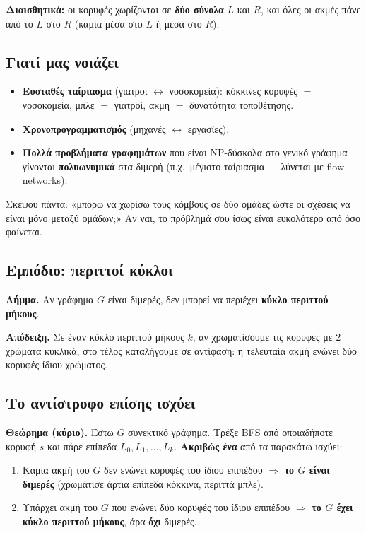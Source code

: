 \documentclass[11pt,a4paper]{article}
\begin{document}
\textbf{Διαισθητικά:} οι κορυφές χωρίζονται σε \textbf{δύο σύνολα} $L$ και $R$,
και όλες οι ακμές πάνε από το $L$ στο $R$ (καμία μέσα στο $L$ ή μέσα στο $R$).

\subsection{Γιατί μας νοιάζει}

\begin{itemize}
  \item \textbf{Ευσταθές ταίριασμα} (γιατροί $\leftrightarrow$ νοσοκομεία):
  κόκκινες κορυφές $=$ νοσοκομεία, μπλε $=$ γιατροί, ακμή $=$ δυνατότητα
  τοποθέτησης.
  \item \textbf{Χρονοπρογραμματισμός} (μηχανές $\leftrightarrow$ εργασίες).
  \item \textbf{Πολλά προβλήματα γραφημάτων} που είναι NP-δύσκολα στο γενικό
  γράφημα γίνονται \textbf{πολυωνυμικά} στα διμερή (π.χ.\ μέγιστο ταίριασμα ---
  λύνεται με flow networks).
\end{itemize}

\begin{intuition}
Σκέψου πάντα: «μπορώ να χωρίσω τους κόμβους σε δύο ομάδες ώστε οι σχέσεις να
είναι μόνο μεταξύ ομάδων;» Αν ναι, το πρόβλημά σου ίσως είναι ευκολότερο από όσο
φαίνεται.
\end{intuition}

\subsection{Εμπόδιο: περιττοί κύκλοι}

\begin{keypoint}
\textbf{Λήμμα.} Αν γράφημα $G$ είναι διμερές, δεν μπορεί να περιέχει \textbf{κύκλο
περιττού μήκους}.

\textbf{Απόδειξη.} Σε έναν κύκλο περιττού μήκους $k$, αν χρωματίσουμε τις κορυφές
με 2 χρώματα κυκλικά, στο τέλος καταλήγουμε σε αντίφαση: η τελευταία ακμή ενώνει
δύο κορυφές ίδιου χρώματος.
\end{keypoint}

\subsection{Το αντίστροφο επίσης ισχύει}

\begin{keypoint}
\textbf{Θεώρημα (κύριο).} Έστω $G$ συνεκτικό γράφημα. Τρέξε BFS από οποιαδήποτε
κορυφή $s$ και πάρε επίπεδα $L_0, L_1, \dots, L_k$. \textbf{Ακριβώς ένα} από τα
παρακάτω ισχύει:
\begin{enumerate}
  \item Καμία ακμή του $G$ δεν ενώνει κορυφές του ίδιου επιπέδου $\Rightarrow$
  \textbf{το $G$ είναι διμερές} (χρωμάτισε άρτια επίπεδα κόκκινα, περιττά μπλε).
  \item Υπάρχει ακμή του $G$ που ενώνει δύο κορυφές του ίδιου επιπέδου
  $\Rightarrow$ \textbf{το $G$ έχει κύκλο περιττού μήκους}, άρα \textbf{όχι}
  διμερές.
\end{enumerate}
\end{keypoint}
\end{document}
